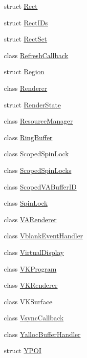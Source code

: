 \begin{DoxyCompactItemize}
\item 
struct \mbox{\hyperlink{structhwcomposer_1_1Rect}{Rect}}
\item 
struct \mbox{\hyperlink{structhwcomposer_1_1RectIDs}{Rect\+I\+Ds}}
\item 
struct \mbox{\hyperlink{structhwcomposer_1_1RectSet}{Rect\+Set}}
\item 
class \mbox{\hyperlink{classhwcomposer_1_1RefreshCallback}{Refresh\+Callback}}
\item 
struct \mbox{\hyperlink{structhwcomposer_1_1Region}{Region}}
\item 
class \mbox{\hyperlink{classhwcomposer_1_1Renderer}{Renderer}}
\item 
struct \mbox{\hyperlink{structhwcomposer_1_1RenderState}{Render\+State}}
\item 
class \mbox{\hyperlink{classhwcomposer_1_1ResourceManager}{Resource\+Manager}}
\item 
class \mbox{\hyperlink{classhwcomposer_1_1RingBuffer}{Ring\+Buffer}}
\item 
class \mbox{\hyperlink{classhwcomposer_1_1ScopedSpinLock}{Scoped\+Spin\+Lock}}
\item 
class \mbox{\hyperlink{classhwcomposer_1_1ScopedSpinLocks}{Scoped\+Spin\+Locks}}
\item 
class \mbox{\hyperlink{classhwcomposer_1_1ScopedVABufferID}{Scoped\+V\+A\+Buffer\+ID}}
\item 
class \mbox{\hyperlink{classhwcomposer_1_1SpinLock}{Spin\+Lock}}
\item 
class \mbox{\hyperlink{classhwcomposer_1_1VARenderer}{V\+A\+Renderer}}
\item 
class \mbox{\hyperlink{classhwcomposer_1_1VblankEventHandler}{Vblank\+Event\+Handler}}
\item 
class \mbox{\hyperlink{classhwcomposer_1_1VirtualDisplay}{Virtual\+Display}}
\item 
class \mbox{\hyperlink{classhwcomposer_1_1VKProgram}{V\+K\+Program}}
\item 
class \mbox{\hyperlink{classhwcomposer_1_1VKRenderer}{V\+K\+Renderer}}
\item 
class \mbox{\hyperlink{classhwcomposer_1_1VKSurface}{V\+K\+Surface}}
\item 
class \mbox{\hyperlink{classhwcomposer_1_1VsyncCallback}{Vsync\+Callback}}
\item 
class \mbox{\hyperlink{classhwcomposer_1_1YallocBufferHandler}{Yalloc\+Buffer\+Handler}}
\item 
struct \mbox{\hyperlink{structhwcomposer_1_1YPOI}{Y\+P\+OI}}
\end{DoxyCompactItemize}

